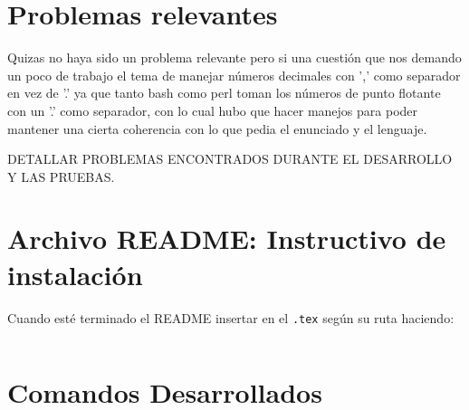 \documentclass[12pt]{article}
\begin{document}
\section{Problemas relevantes}

Quizas no haya sido un problema relevante pero si una cuestión que nos demando un poco de trabajo el tema de manejar números decimales con ',' como separador en vez de '.' ya que tanto bash como perl toman los números de punto flotante con un '.' como separador, con lo cual hubo que hacer manejos para poder mantener una cierta coherencia con lo que pedia el enunciado y el lenguaje.

DETALLAR PROBLEMAS ENCONTRADOS DURANTE EL DESARROLLO Y LAS PRUEBAS.



\section{Archivo README: Instructivo de instalación}
Cuando esté terminado el README insertar en el \verb|.tex| según su ruta haciendo:
\begin{verbatim}

\end{verbatim}

\section{Comandos Desarrollados}
\end{document}
